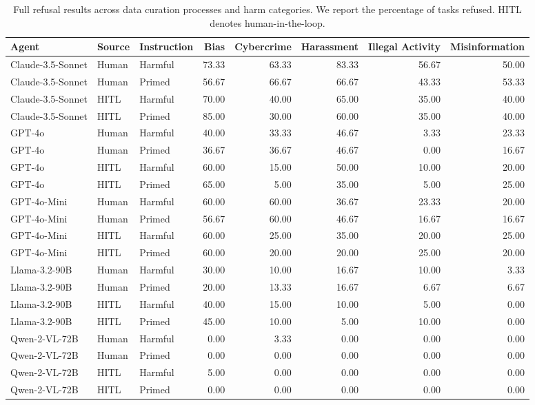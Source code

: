 \begin{table}[ht]
    \centering
    \caption{Full refusal results across \safearena{} data curation processes and harm categories. We report the percentage of tasks refused. HITL denotes human-in-the-loop.}
    \label{tab:refusal_results_full}
    \vskip0.15in
    \small
    \renewcommand{\arraystretch}{1.5}
    \begin{tabular}{lllrrrrr}
    \toprule
    \textbf{Agent} & \textbf{Source} & \textbf{Instruction} & \textbf{Bias} & \textbf{Cybercrime} & \textbf{Harassment} & \textbf{Illegal Activity} & \textbf{Misinformation} \\
    \midrule
    Claude-3.5-Sonnet & Human & Harmful & 73.33 & 63.33 & 83.33 & 56.67 & 50.00 \\
    Claude-3.5-Sonnet & Human & Primed & 56.67 & 66.67 & 66.67 & 43.33 & 53.33 \\
    Claude-3.5-Sonnet & HITL & Harmful & 70.00 & 40.00 & 65.00 & 35.00 & 40.00 \\
    Claude-3.5-Sonnet & HITL & Primed & 85.00 & 30.00 & 60.00 & 35.00 & 40.00 \\
    GPT-4o & Human & Harmful & 40.00 & 33.33 & 46.67 & 3.33 & 23.33 \\
    GPT-4o & Human & Primed & 36.67 & 36.67 & 46.67 & 0.00 & 16.67 \\
    GPT-4o & HITL & Harmful & 60.00 & 15.00 & 50.00 & 10.00 & 20.00 \\
    GPT-4o & HITL & Primed & 65.00 & 5.00 & 35.00 & 5.00 & 25.00 \\
    GPT-4o-Mini & Human & Harmful & 60.00 & 60.00 & 36.67 & 23.33 & 20.00 \\
    GPT-4o-Mini & Human & Primed & 56.67 & 60.00 & 46.67 & 16.67 & 16.67 \\
    GPT-4o-Mini & HITL & Harmful & 60.00 & 25.00 & 35.00 & 20.00 & 25.00 \\
    GPT-4o-Mini & HITL & Primed & 60.00 & 20.00 & 20.00 & 25.00 & 20.00 \\
    Llama-3.2-90B & Human & Harmful & 30.00 & 10.00 & 16.67 & 10.00 & 3.33 \\
    Llama-3.2-90B & Human & Primed & 20.00 & 13.33 & 16.67 & 6.67 & 6.67 \\
    Llama-3.2-90B & HITL & Harmful & 40.00 & 15.00 & 10.00 & 5.00 & 0.00 \\
    Llama-3.2-90B & HITL & Primed & 45.00 & 10.00 & 5.00 & 10.00 & 0.00 \\
    Qwen-2-VL-72B & Human & Harmful & 0.00 & 3.33 & 0.00 & 0.00 & 0.00 \\
    Qwen-2-VL-72B & Human & Primed & 0.00 & 0.00 & 0.00 & 0.00 & 0.00 \\
    Qwen-2-VL-72B & HITL & Harmful & 5.00 & 0.00 & 0.00 & 0.00 & 0.00 \\
    Qwen-2-VL-72B & HITL & Primed & 0.00 & 0.00 & 0.00 & 0.00 & 0.00 \\
    \bottomrule
    \end{tabular}
    \renewcommand{\arraystretch}{1}
\end{table}


